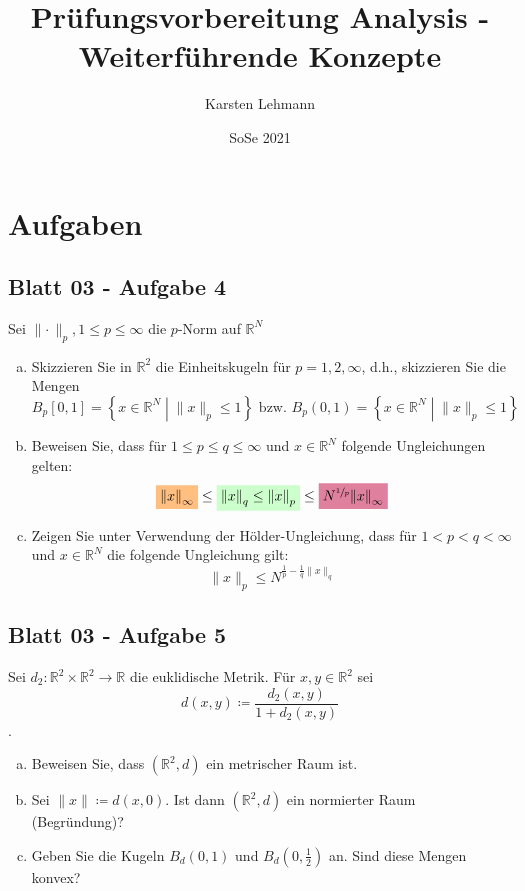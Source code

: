 \documentclass{scrreprt}
\author{Karsten Lehmann}
\date{SoSe 2021}
\title{Prüfungsvorbereitung Analysis - Weiterführende Konzepte}
\begin{document}
\tableofcontents
\newpage
\chapter{Aufgaben}
\section{Blatt 03 - Aufgabe 4}

Sei $\lVert \cdot\, \rVert_p, 1 \leq p \leq \infty$ die $p$-Norm auf $\mathbb{R}^N$
\begin{enumerate}[a)]
\item Skizzieren Sie in $\mathbb{R}^2$ die Einheitskugeln für
  $p = 1, 2, \infty$, d.h., skizzieren Sie die Mengen
  \[
    B_p[0, 1] = \left\{ x \in \mathbb{R}^N \middle| \lVert x \rVert_p \leq 1 \right\}
    \text{ bzw. }
    B_p(0, 1) = \left\{ x \in \mathbb{R}^N \middle| \lVert x \rVert_p \leq 1 \right\}
  \]

  \item Beweisen Sie, dass für $1 \leq p \leq q \leq \infty$ und
    $x \in \mathbb{R}^N$ folgende Ungleichungen gelten:
    \[
      \colorbox{orange!50}{$\norm{x}_{\infty}$}
      \leq \colorbox{green!20}{$\norm{x}_q \leq \norm{x}_p$}
      \leq \colorbox{purple!50}{$N^{\sfrac{1}{p}} \norm{x}_{\infty}$}
    \]

  \item Zeigen Sie unter Verwendung der Hölder-Ungleichung, dass für
    $1 < p < q < \infty$ und $x \in \mathbb{R}^N$ die folgende Ungleichung
    gilt:
    \[
      \lVert x \rVert_p \leq N^{\frac{1}{p} - \frac{1}{q} \lVert x \rVert_q}
    \]
  \end{enumerate}

\section{Blatt 03 -  Aufgabe 5}

Sei $d_2 \colon \mathbb{R}^2 \times \mathbb{R}^2 \to \mathbb{R}$ die
euklidische Metrik. Für $x, y \in \mathbb{R}^2$ sei
\[
  d(x, y) \coloneqq \frac{d_2(x, y)}{1 + d_2(x, y)}
\].
\begin{enumerate}[a)]
\item Beweisen Sie, dass $\left( \mathbb{R}^2, d \right)$ ein metrischer
  Raum ist.
\item Sei $\lVert x \rVert \coloneqq d(x, 0)$.
  Ist dann $\left( \mathbb{R}^2, d \right)$ ein normierter Raum (Begründung)?
\item Geben Sie die Kugeln $B_d(0, 1)$ und $B_d\left( 0, \frac{1}{2} \right)$
  an. Sind diese Mengen \colorbox{purple!20}{konvex}?
\end{enumerate}
\end{document}
